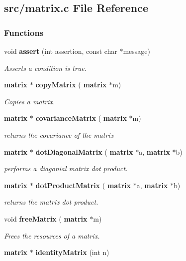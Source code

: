 \subsection{src/matrix.c File Reference}
\label{matrix_8c}
\subsubsection*{Functions}
\begin{DoxyCompactItemize}
\item 
void \textbf{ assert} (int assertion, const char $\ast$message)
\begin{DoxyCompactList}\small\item\em Asserts a condition is true. \end{DoxyCompactList}\item 
\textbf{ matrix} $\ast$ \textbf{ copy\+Matrix} (\textbf{ matrix} $\ast$m)
\begin{DoxyCompactList}\small\item\em Copies a matrix. \end{DoxyCompactList}\item 
\textbf{ matrix} $\ast$ \textbf{ covariance\+Matrix} (\textbf{ matrix} $\ast$m)
\begin{DoxyCompactList}\small\item\em returns the covariance of the matrix \end{DoxyCompactList}\item 
\textbf{ matrix} $\ast$ \textbf{ dot\+Diagonal\+Matrix} (\textbf{ matrix} $\ast$a, \textbf{ matrix} $\ast$b)
\begin{DoxyCompactList}\small\item\em performs a diagonial matrix dot product. \end{DoxyCompactList}\item 
\textbf{ matrix} $\ast$ \textbf{ dot\+Product\+Matrix} (\textbf{ matrix} $\ast$a, \textbf{ matrix} $\ast$b)
\begin{DoxyCompactList}\small\item\em returns the matrix dot product. \end{DoxyCompactList}\item 
void \textbf{ free\+Matrix} (\textbf{ matrix} $\ast$m)
\begin{DoxyCompactList}\small\item\em Frees the resources of a matrix. \end{DoxyCompactList}\item 
\textbf{ matrix} $\ast$ \textbf{ identity\+Matrix} (int n)

\end{DoxyCompactItemize}
